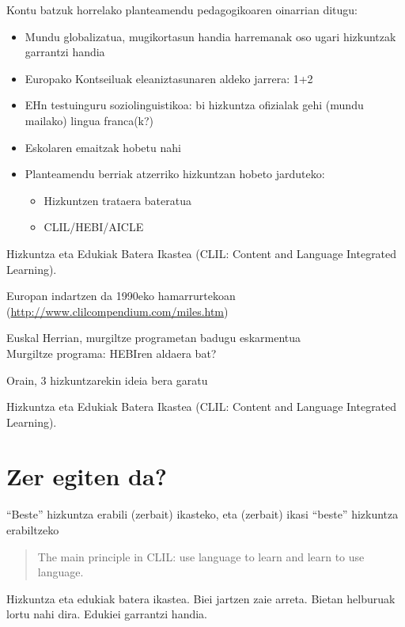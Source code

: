 \documentclass[
]{book}
\providecommand{\tightlist}{%
  \setlength{\itemsep}{0pt}\setlength{\parskip}{0pt}}
\begin{document}
Kontu batzuk horrelako planteamendu pedagogikoaren oinarrian ditugu:

\begin{itemize}
\tightlist
\item
  Mundu globalizatua, mugikortasun handia harremanak oso ugari hizkuntzak garrantzi handia
\item
  Europako Kontseiluak eleaniztasunaren aldeko jarrera: 1+2
\item
  EHn testuinguru soziolinguistikoa: bi hizkuntza ofizialak gehi (mundu mailako) lingua franca(k?)
\item
  Eskolaren emaitzak hobetu nahi
\item
  Planteamendu berriak atzerriko hizkuntzan hobeto jarduteko:

  \begin{itemize}
  \tightlist
  \item
    Hizkuntzen trataera bateratua
  \item
    CLIL/HEBI/AICLE
  \end{itemize}
\end{itemize}

Hizkuntza eta Edukiak Batera Ikastea (CLIL: Content and Language Integrated Learning).

Europan indartzen da 1990eko hamarrurtekoan (\url{http://www.clilcompendium.com/miles.htm})

Euskal Herrian, murgiltze programetan badugu eskarmentua\\
\hspace{0pt} Murgiltze programa: HEBIren aldaera bat?

Orain, 3 hizkuntzarekin ideia bera garatu

Hizkuntza eta Edukiak Batera Ikastea (CLIL: Content and Language Integrated Learning).

\hypertarget{zer-egiten-da}{%
\section{Zer egiten da?}\label{zer-egiten-da}}

``Beste'' hizkuntza erabili (zerbait) ikasteko, eta (zerbait) ikasi ``beste'' hizkuntza erabiltzeko

\begin{quote}
The main principle in CLIL: use language to learn and learn to use language.
\end{quote}

Hizkuntza eta edukiak batera ikastea. Biei jartzen zaie arreta. Bietan helburuak lortu nahi dira. Edukiei garrantzi handia.
\end{document}
